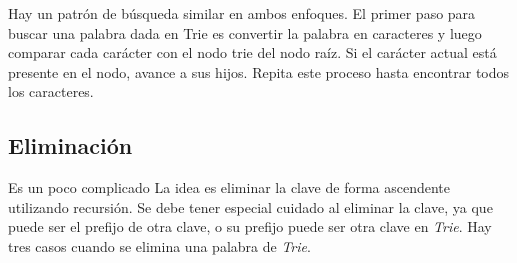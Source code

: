 Hay un patrón de búsqueda similar en ambos enfoques. El primer paso para buscar una palabra dada en Trie es convertir la palabra en caracteres y luego comparar cada carácter con el nodo trie del nodo raíz. Si el carácter actual está presente en el nodo, avance a sus hijos. Repita este proceso hasta encontrar todos los caracteres.

\subsection{Eliminación}

Es un poco complicado La idea es eliminar la clave de forma ascendente utilizando recursión. Se debe tener especial cuidado al eliminar la clave, ya que puede ser el prefijo de otra clave, o su prefijo puede ser otra clave en \emph{Trie}. Hay tres casos cuando se elimina una palabra de \emph{Trie}.

